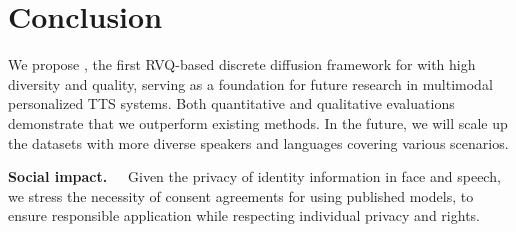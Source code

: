 \section{Conclusion}
\label{sec:conclusion} 
We propose \methodname, the first RVQ-based discrete diffusion framework for \taskname with high diversity and quality, serving as a foundation for future research in multimodal personalized TTS systems. 
Both quantitative and qualitative evaluations demonstrate that we outperform existing methods.
In the future, we will scale up the datasets with more diverse speakers and languages covering various scenarios. 


\textbf{Social impact.~~\xspace} 
Given the privacy of identity information in face and speech, we stress the necessity of consent agreements for using published models, to ensure responsible application while respecting individual privacy and rights.








